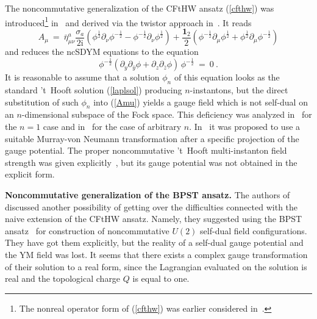 \documentclass[a4paper,11pt]{article}
\numberwithin{equation}{section}
\def\p{\phi}
\def\s{\sigma}
\def\pa{\partial}
\newcommand{\im}{\mathrm{i}}
\begin{document}
The noncommutative generalization of the CFtHW ansatz (\ref{cfthw}) was 
introduced\footnote{The nonreal operator form of (\ref{cfthw}) was earlier 
considered in~\cite{NS}.} 
in~\cite{Correa1} and derived via the twistor approach in~\cite{LP1}.
It reads
\begin{equation}\label{Amu}
A_\mu\ =\ \bar\eta^a_{\mu\nu}\frac{\s_a}{2\im}
\left(\p^{\frac{1}{2}}\pa_\nu\p^{-\frac{1}{2}}-\p^{-\frac{1}{2}}\pa_\nu\p^{\frac{1}{2}}\right)
+ \frac{{\mathbf 1}_2}{2}
\left(\p^{-\frac{1}{2}}\pa_\mu\p^{\frac{1}{2}}+\p^{\frac{1}{2}}\pa_\mu\p^{-\frac{1}{2}}\right)
\end{equation}
and reduces the ncSDYM equations to the equation
\begin{equation}\label{redop}
\phi^{-\frac{1}{2}}
(\pa_y\pa_{\bar y}\phi + \pa_z\pa_{\bar z}\phi )\,\phi^{-\frac{1}{2}}\ =\ 0\ .
\end{equation}
It is reasonable to assume that a solution $\phi_n$ of 
this equation looks as the standard 't~Hooft  solution (\ref{laplsol})
producing $n$-instantons, but the direct substitution of such $\phi_n$ into 
(\ref{Amu}) yields a gauge field which is not self-dual on an 
$n$-dimensional subspace of the Fock space. This deficiency was 
analyzed in~\cite{Correa1} for the $n=1$ case and in~\cite{LP1} for the case of 
arbitrary $n$. In~\cite{LP1} it was proposed to use  
a suitable Murray-von Neumann transformation after a specific projection of the gauge 
potential. The proper noncommutative 't~Hooft multi-instanton field 
strength was given explicitly~\cite{LP1}, but its gauge 
potential was not obtained in the explicit form.  
 
\medskip

{\bf Noncommutative generalization of the BPST ansatz.}
The authors of \cite{Correa1} discussed another possibility of getting over the 
difficulties connected with the naive extension of the CFtHW ansatz. Namely, 
they suggested using the BPST ansatz~\cite{Belavin}  
for construction of noncommutative $U(2)$ self-dual field configurations. They have got
them explicitly, but the reality of a self-dual gauge potential and the YM field
was lost. It seems that there exists a complex gauge transformation
of their solution to a real form, since the Lagrangian evaluated on the solution is
real and the topological charge $Q$ is equal to one. 
\end{document}
